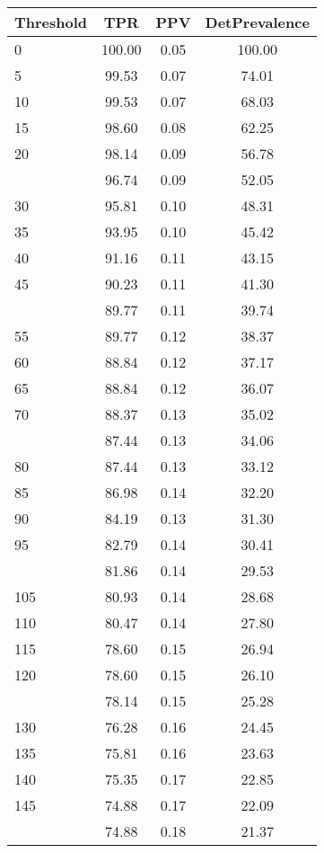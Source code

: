 \begin{table}[ht]
\centering
\begin{tabular}{lccc}
  \toprule
Threshold & TPR & PPV & DetPrevalence \\ 
  \midrule
0 & 100.00 & 0.05 & 100.00 \\ 
  5 & 99.53 & 0.07 & 74.01 \\ 
  10 & 99.53 & 0.07 & 68.03 \\ 
  15 & 98.60 & 0.08 & 62.25 \\ 
  20 & 98.14 & 0.09 & 56.78 \\ 
   \addlinespace
25 & 96.74 & 0.09 & 52.05 \\ 
  30 & 95.81 & 0.10 & 48.31 \\ 
  35 & 93.95 & 0.10 & 45.42 \\ 
  40 & 91.16 & 0.11 & 43.15 \\ 
  45 & 90.23 & 0.11 & 41.30 \\ 
   \addlinespace
50 & 89.77 & 0.11 & 39.74 \\ 
  55 & 89.77 & 0.12 & 38.37 \\ 
  60 & 88.84 & 0.12 & 37.17 \\ 
  65 & 88.84 & 0.12 & 36.07 \\ 
  70 & 88.37 & 0.13 & 35.02 \\ 
   \addlinespace
75 & 87.44 & 0.13 & 34.06 \\ 
  80 & 87.44 & 0.13 & 33.12 \\ 
  85 & 86.98 & 0.14 & 32.20 \\ 
  90 & 84.19 & 0.13 & 31.30 \\ 
  95 & 82.79 & 0.14 & 30.41 \\ 
   \addlinespace
100 & 81.86 & 0.14 & 29.53 \\ 
  105 & 80.93 & 0.14 & 28.68 \\ 
  110 & 80.47 & 0.14 & 27.80 \\ 
  115 & 78.60 & 0.15 & 26.94 \\ 
  120 & 78.60 & 0.15 & 26.10 \\ 
   \addlinespace
125 & 78.14 & 0.15 & 25.28 \\ 
  130 & 76.28 & 0.16 & 24.45 \\ 
  135 & 75.81 & 0.16 & 23.63 \\ 
  140 & 75.35 & 0.17 & 22.85 \\ 
  145 & 74.88 & 0.17 & 22.09 \\ 
   \addlinespace
150 & 74.88 & 0.18 & 21.37 \\ 

\end{tabular}
\end{table}
